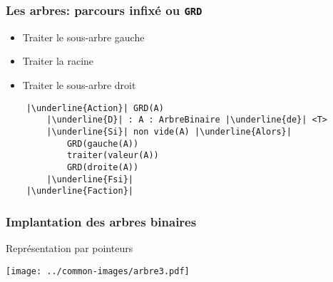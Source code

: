 \documentclass[table,handout,tikz,12pt,svgnames]{beamer}
\begin{document}
\begin{frame}[fragile=singleslide]
	\frametitle{Les arbres: parcours infixé ou \texttt{GRD}}
	\begin{block}{}%
		\begin{itemize}
			\item Traiter le sous-arbre gauche
			\item Traiter la racine
			\item Traiter le sous-arbre droit
		\end{itemize}
	\end{block}
	\begin{block}{}
		\begin{verbatim}
	|\underline{Action}| GRD(A)
		|\underline{D}| : A : ArbreBinaire |\underline{de}| <T>
		|\underline{Si}| non vide(A) |\underline{Alors}|
			GRD(gauche(A))
			traiter(valeur(A))
			GRD(droite(A))
		|\underline{Fsi}|
	|\underline{Faction}|
		\end{verbatim}
	\end{block}
\end{frame}

\begin{frame}[fragile=singleslide]
	\frametitle{Implantation des arbres binaires}
	\begin{block}{Représentation par pointeurs}%
		\begin{center}
			{\texttt{[image: ../common-images/arbre3.pdf]}}
		\end{center}
	\end{block}
\end{frame}
\end{document}
